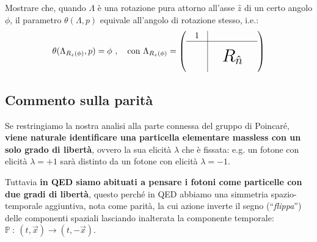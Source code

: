 \documentclass[../main.tex]{subfiles}
\begin{document}
\begin{exercise}
    Mostrare che, quando $\Lambda$ è una rotazione pura attorno all'asse $\hat{z}$ di un certo angolo $\phi$, il parametro \(\theta(\Lambda, p)\) equivale all'angolo di rotazione stesso, i.e.:
    \begin{equation}
        \theta(\Lambda_{R_z(\phi)}, p) = \phi ~,\quad \text{con }
        \Lambda_{R_z(\phi)} = 
        \begin{pmatrix} 
        \begin{array}{c|c}
            1 & \begin{array}{ccc} \phantom 0 & \phantom 0 & \phantom 0 \end{array} \\
            \hline
            \begin{array}{c} \phantom 0 \\ \phantom 0 \\ \phantom 0 \end{array} & \begin{array}{c} \vcenter{\hbox{\hspace*{7pt}\huge$R_{\hat{n}}$\hspace*{7pt}}} \end{array}
        \end{array}
        \end{pmatrix}
        \label{eq:theta_param_as_rotangle}
    \end{equation}
\end{exercise}

\subsection{Commento sulla parità}
Se restringiamo la nostra analisi alla parte connessa del gruppo di Poincaré, \textbf{viene naturale identificare una particella elementare massless con un solo grado di libertà}, ovvero la sua elicità $\lambda$ che è fissata:
e.g. un fotone con elicità $\lambda = +1$ sarà distinto da un fotone con elicità $\lambda = -1$.

Tuttavia \textbf{in QED siamo abituati a pensare i fotoni come particelle con due gradi di libertà}, questo perché in QED abbiamo una simmetria spazio-temporale aggiuntiva, nota come parità, la cui azione inverte il segno (“\textit{flippa}”) delle componenti spaziali lasciando inalterata la componente temporale: \(\mathbb P ~:~(t,\Vec{x}) \rightarrow (t,-\Vec{x})\).
\end{document}
